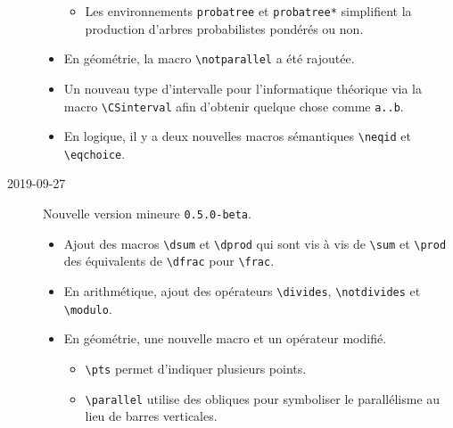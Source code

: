 \documentclass[12pt,a4paper]{article}
\begin{document}
\begin{description}
\begin{itemize}[itemsep=.5em]
\begin{itemize}[itemsep=.5em]
            \item Les environnements \verb+probatree+ et \verb+probatree*+ simplifient la production d'arbres probabilistes pondérés ou non.
        \end{itemize}
    
    
        \item En géométrie, la macro \verb+\notparallel+ a été rajoutée.
    
    
        \item Un nouveau type d'intervalle pour l'informatique théorique via la macro \verb+\CSinterval+ afin d'obtenir quelque chose comme \verb+a..b+.
    
    
        \item En logique, il y a deux nouvelles macros sémantiques \verb+\neqid+ et \verb+\eqchoice+.
    \end{itemize}


    \medskip
    \item[2019-09-27] Nouvelle version mineure \verb+0.5.0-beta+.
    
    \begin{itemize}[itemsep=.5em]
        \item Ajout des macros \verb+\dsum+ et \verb+\dprod+ qui sont vis à vis de \verb+\sum+ et \verb+\prod+ des équivalents de \verb+\dfrac+ pour \verb+\frac+.
    
    
        \item En arithmétique, ajout des opérateurs \verb+\divides+, \verb+\notdivides+ et \verb+\modulo+.
    
    
        \item En géométrie, une nouvelle macro et un opérateur modifié.
        \begin{itemize}[itemsep=.5em]
            \item \verb+\pts+ permet d'indiquer plusieurs points.
    
            \item \verb+\parallel+ utilise des obliques pour symboliser le parallélisme au lieu de barres verticales.
        \end{itemize}
    

\end{itemize}
\end{description}
\end{document}
